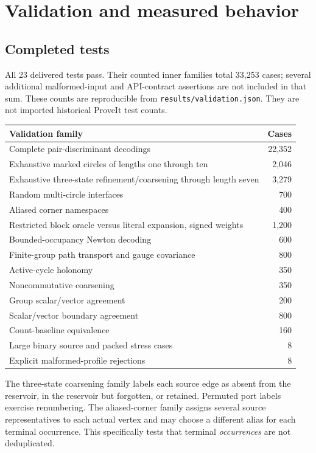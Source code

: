 \documentclass[11pt]{article}
\theoremstyle{definition}\newtheorem{definition}[theorem]{Definition}\newtheorem{example}[theorem]{Example}
\theoremstyle{remark}\newtheorem{remark}[theorem]{Remark}
\newcommand{\code}[1]{\texttt{#1}}
\begin{document}
\section{Validation and measured behavior}
\label{sec:evidence}
\subsection{Completed tests}
All 23 delivered tests pass. Their counted inner families total 33,253 cases; several additional malformed-input and API-contract assertions are not included in that sum. These counts are reproducible from \code{results/validation.json}. They are not imported historical ProveIt test counts.

\begin{center}\small
\begin{tabular}{@{}lr@{}}\toprule
Validation family & Cases\\\midrule
Complete pair-discriminant decodings & 22,352\\
Exhaustive marked circles of lengths one through ten & 2,046\\
Exhaustive three-state refinement/coarsening through length seven & 3,279\\
Random multi-circle interfaces & 700\\
Aliased corner namespaces & 400\\
Restricted block oracle versus literal expansion, signed weights & 1,200\\
Bounded-occupancy Newton decoding & 600\\
Finite-group path transport and gauge covariance & 800\\
Active-cycle holonomy & 350\\
Noncommutative coarsening & 350\\
Group scalar/vector agreement & 200\\
Scalar/vector boundary agreement & 800\\
Count-baseline equivalence & 160\\
Large binary source and packed stress cases & 8\\
Explicit malformed-profile rejections & 8\\\bottomrule
\end{tabular}
\end{center}

The three-state coarsening family labels each source edge as absent from the reservoir, in the reservoir but forgotten, or retained. Permuted port labels exercise renumbering. The aliased-corner family assigns several source representatives to each actual vertex and may choose a different alias for each terminal occurrence. This specifically tests that terminal \emph{occurrences} are not deduplicated.
\end{document}
